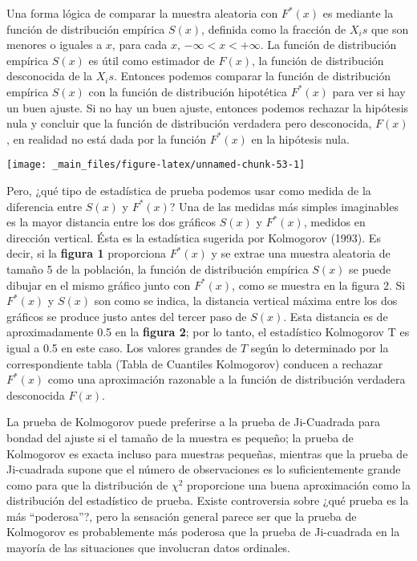 \documentclass[
  a4paper,
  oneside,
  openany]{book}
\begin{document}
Una forma lógica de comparar la muestra aleatoria con \(F^*(x)\) es mediante la función de distribución empírica \(S(x)\), definida como la fracción de \(X_{i}s\) que son menores o iguales a \(x\), para cada \(x\), \(-\infty<x< + \infty\).
La función de distribución empírica \(S(x)\) es útil como estimador de \(F(x)\), la función de distribución desconocida de la \(X_{i}s\). Entonces podemos comparar la función de distribución empírica \(S(x)\) con la función de distribución hipotética \(F^*(x)\) para ver si hay un buen ajuste.
Si no hay un buen ajuste, entonces podemos rechazar la hipótesis nula y concluir que la función de distribución verdadera pero desconocida, \(F(x)\), en realidad no está dada por la función \(F^*(x)\) en la hipótesis nula.

\begin{center}\texttt{[image: \_main\_files/figure-latex/unnamed-chunk-53-1]} \end{center}

Pero, ¿qué tipo de estadística de prueba podemos usar como medida de la diferencia entre \(S(x)\) y \(F^* (x)\)? Una de las medidas más simples imaginables es la mayor distancia entre los dos gráficos \(S(x)\) y \(F^*(x)\), medidos en dirección vertical. Ésta es la estadística sugerida por Kolmogorov (1993).
Es decir, si la \textbf{figura 1} proporciona \(F^*(x)\) y se extrae una muestra aleatoria de tamaño 5 de la población, la función de distribución empírica \(S(x)\) se puede dibujar en el mismo gráfico junto con \(F^ *(x)\), como se muestra en la figura 2.
Si \(F^*(x)\) y \(S(x)\) son como se indica, la distancia vertical máxima entre los dos gráficos se produce justo antes del tercer paso de \(S(x)\).
Esta distancia es de aproximadamente 0.5 en la \textbf{figura 2}; por lo tanto, el estadístico Kolmogorov T es igual a 0.5 en este caso.
Los valores grandes de \(T\) según lo determinado por la correspondiente tabla (Tabla de Cuantiles Kolmogorov) conducen a rechazar \(F^*(x)\) como una aproximación razonable a la función de distribución verdadera desconocida \(F(x)\).

La prueba de Kolmogorov puede preferirse a la prueba de Ji-Cuadrada para bondad del ajuste si el tamaño de la muestra es pequeño; la prueba de Kolmogorov es exacta incluso para muestras pequeñas, mientras que la prueba de Ji-cuadrada supone que el número de observaciones es lo suficientemente grande como para que la distribución de \(\chi^2\) proporcione una buena aproximación como la distribución del estadístico de prueba. Existe controversia sobre ¿qué prueba es la más ``poderosa''?, pero la sensación general parece ser que la prueba de Kolmogorov es probablemente más poderosa que la prueba de Ji-cuadrada en la mayoría de las situaciones que involucran datos ordinales.
\end{document}
